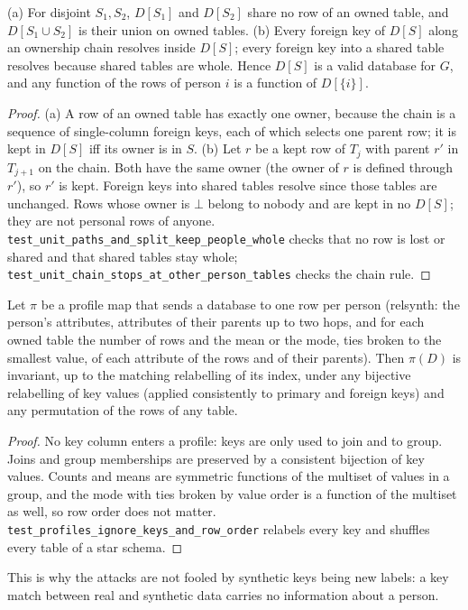 \setcounter{proposition}{599}
\begin{proposition}\label{prop:pusplit}
(a) For disjoint $S_1,S_2$, $D[S_1]$ and $D[S_2]$ share no row of an owned table, and $D[S_1\cup S_2]$ is their union on owned tables. (b) Every foreign key of $D[S]$ along an ownership chain resolves inside $D[S]$; every foreign key into a shared table resolves because shared tables are whole. Hence $D[S]$ is a valid database for $G$, and any function of the rows of person $i$ is a function of $D[\{i\}]$.
\end{proposition}
\begin{proof}
(a) A row of an owned table has exactly one owner, because the chain is a sequence of single-column foreign keys, each of which selects one parent row; it is kept in $D[S]$ iff its owner is in $S$. (b) Let $r$ be a kept row of $T_j$ with parent $r'$ in $T_{j+1}$ on the chain. Both have the same owner (the owner of $r$ is defined through $r'$), so $r'$ is kept. Foreign keys into shared tables resolve since those tables are unchanged. Rows whose owner is $\bot$ belong to nobody and are kept in no $D[S]$; they are not personal rows of anyone. \texttt{test\_unit\_paths\_and\_split\_keep\_people\_whole} checks that no row is lost or shared and that shared tables stay whole; \texttt{test\_unit\_chain\_stops\_at\_other\_person\_tables} checks the chain rule.
\end{proof}

\setcounter{proposition}{604}
\begin{proposition}\label{prop:puprofile}
Let $\pi$ be a profile map that sends a database to one row per person (relsynth: the person's attributes, attributes of their parents up to two hops, and for each owned table the number of rows and the mean or the mode, ties broken to the smallest value, of each attribute of the rows and of their parents). Then $\pi(D)$ is invariant, up to the matching relabelling of its index, under any bijective relabelling of key values (applied consistently to primary and foreign keys) and any permutation of the rows of any table.
\end{proposition}
\begin{proof}
No key column enters a profile: keys are only used to join and to group. Joins and group memberships are preserved by a consistent bijection of key values. Counts and means are symmetric functions of the multiset of values in a group, and the mode with ties broken by value order is a function of the multiset as well, so row order does not matter. \texttt{test\_profiles\_ignore\_keys\_and\_row\_order} relabels every key and shuffles every table of a star schema.
\end{proof}
\noindent This is why the attacks are not fooled by synthetic keys being new labels: a key match between real and synthetic data carries no information about a person.

